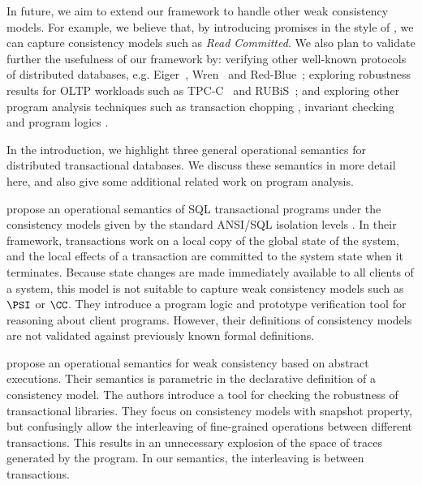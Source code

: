 In future, we aim to extend our framework to handle other 
weak consistency models. For example, we believe that, by introducing promises 
in the style of \cite{promises}, we can capture  consistency models such 
as \emph{Read Committed}. We also plan to validate further the usefulness of our framework
by: verifying other well-known protocols of 
distributed databases, e.g. Eiger~\cite{eiger}, Wren~\cite{wren} and
Red-Blue~\cite{redblue};  exploring robustness results for OLTP
workloads  such as TPC-C~\cite{tpcc} and RUBiS~\cite{rubis}; 
and exploring other program analysis techniques such as 
transaction chopping \cite{chopping,psi-chopping}, invariant checking 
\cite{cise,repliss} and program logics \cite{alonetogether}. 

In the introduction, we highlight three general operational semantics for 
distributed transactional databases. We discuss these semantics in more detail here,
and also give some additional related work on program analysis. 

\citet{alonetogether} propose an operational semantics of SQL transactional programs 
under the consistency models given by the standard ANSI/SQL isolation levels \cite{si}.
In their  framework, transactions work on a local copy of the global state 
of the system, and the local effects of a transaction are committed to the  
system state when it terminates. Because state changes 
are made immediately available to all clients of a system, this model 
is not suitable to capture weak consistency models such as \(\PSI\) or \(\CC\). 
They introduce a program logic and prototype verification tool for reasoning 
about client programs. However, their definitions of consistency models 
are not validated against previously known 
formal definitions.

\citet{sureshConcur} propose an operational semantics for weak consistency 
based on abstract executions. Their semantics 
is parametric in the declarative definition of a consistency model. 
The authors introduce a tool for checking the robustness of transactional  
libraries.
They focus on consistency models with snapshot property, but confusingly allow 
the interleaving of fine-grained operations between different transactions. 
This results in an unnecessary explosion of the space of traces generated by 
the program. In our semantics, the interleaving is between transactions.

